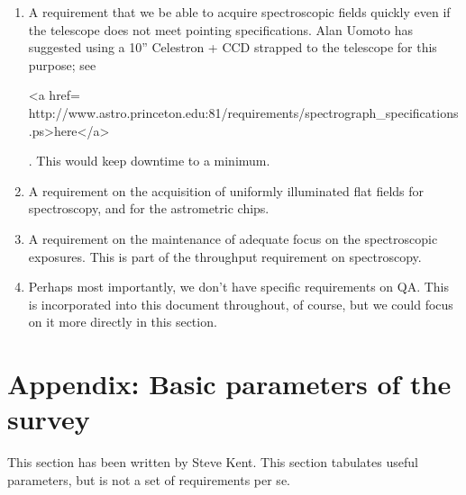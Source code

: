 \begin{enumerate}
\item A requirement that we be able to acquire spectroscopic fields
quickly even if the telescope does not meet pointing specifications.
Alan Uomoto has suggested using a 10'' Celestron + CCD strapped to the
telescope for this purpose; see 
\begin{rawhtml}
<a href=
http://www.astro.princeton.edu:81/requirements/spectrograph_specifications.ps>here</a>\end{rawhtml}.
This would keep downtime to a minimum. 

\item A requirement on the acquisition of uniformly illuminated flat
fields for spectroscopy, and for the astrometric chips.  

\item A requirement on the maintenance of adequate focus on the
spectroscopic exposures.  This is part of the throughput requirement
on spectroscopy. 

\item Perhaps most importantly, we don't have specific requirements on
QA.  This is incorporated into this document throughout, of course,
but we could focus on it more directly in this section. 

\end{enumerate}

\appendix
\section{Appendix: Basic parameters of the survey}
This section has been written by Steve Kent.  This section tabulates
useful parameters, but is not a set of requirements per se. 

